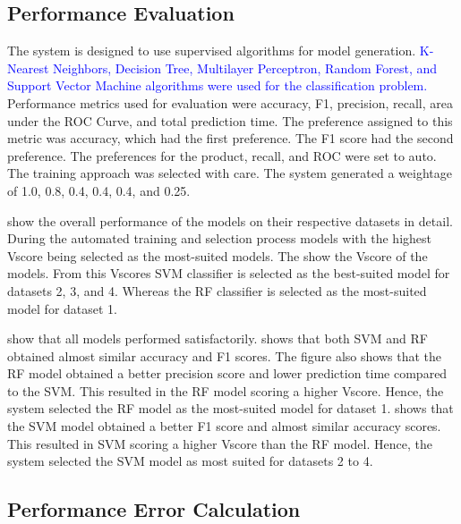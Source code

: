 \documentclass[a4paper,fleqn]{cas-dc}
\newcommand{\responsemodsm}[1]{\textcolor{blue}{#1}}
\begin{document}
\subsection{Performance Evaluation} \label{subsec:performance_evaluation}

The system is designed to use supervised algorithms for model generation. \responsemodsm{K-Nearest Neighbors, Decision Tree, Multilayer Perceptron, Random Forest, and Support Vector Machine algorithms were used for the classification problem.} Performance metrics used for evaluation were accuracy, F1, precision, recall, area under the ROC Curve, and total prediction time. The preference assigned to this metric was accuracy, which had the first preference. The F1 score had the second preference. The preferences for the product, recall, and ROC were set to auto. The training approach was selected with care. The system generated a weightage of 1.0, 0.8, 0.4, 0.4, 0.4, and 0.25.

 show the overall performance of the models on their respective datasets in detail. During the automated training and selection process models with the highest Vscore being selected as the most-suited models. The  show the Vscore of the models. From this Vscores SVM classifier is selected as the best-suited model for datasets 2, 3, and 4. Whereas the RF classifier is selected as the most-suited model for dataset 1.

 show that all models performed satisfactorily.  shows that both SVM and RF obtained almost similar accuracy and F1 scores. The figure also shows that the RF model obtained a better precision score and lower prediction time compared to the SVM. This resulted in the RF model scoring a higher Vscore. Hence, the system selected the RF model as the most-suited model for dataset 1.  shows that the SVM model obtained a better F1 score and almost similar accuracy scores. This resulted in SVM scoring a higher Vscore than the RF model. Hence, the system selected the SVM model as most suited for datasets 2 to 4.

\subsection{Performance Error Calculation}
\end{document}
